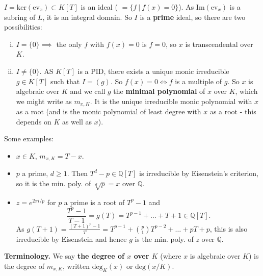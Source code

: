 \documentclass{article}
\theoremstyle{definition}
\begin{document}
$I = \text{ker}(\text{ev}_x) \subset K[T]$ is an ideal ( $= \{f ~|~ f(x)=0\}$). As $\text{Im}(\text{ev}_x)$ is a subring of $L$, it is an integral domain. So $I$ is a \textbf{prime} ideal, so there are two possibilities:
\begin{enumerate}[(i)]
    \item $I = \{0\} \implies $ the only $f$ with $f(x)=0$ is $f=0$, so $x$ is transcendental over $K$.
    \item $I \neq \{0\}$. AS $K[T]$ is a PID, there exists a unique monic irreducible $g \in K[T]$ such that $I = (g)$. So $f(x) = 0 \iff f$ is a multiple of $g$. So $x$ is algebraic over $K$ and we call $g$ the \textbf{minimal polynomial} of $x$ over $K$, which we might write as $m_{x,K}$. It is the unique irreducible monic polynomial with $x$ as a root (and is the monic polynomial of least degree with $x$ as a root - this depends on $K$ as well as $x$).
\end{enumerate}
Some examples:
\begin{itemize}
    \item $x \in K$, $m_{x,K} = T-x$.
    \item $p$ a prime, $d \ge 1$. Then $T^d - p \in \mathbb{Q}[T]$ is irreducible by Eisenstein's criterion, so it is the min. poly. of $\sqrt[d]{p} = x$ over $\mathbb{Q}$.
    \item $z = e^{2 \pi i/p}$ for $p$ a prime is a root of $T^p - 1$ and $$\frac{T^p-1}{T-1} = g(T) = T^{p-1} + \ldots + T + 1 \in \mathbb{Q}[T].$$
    As $g(T+1) = \frac{(T+1)^p - 1}{T} = T^{p-1} + {{p} \choose {1}} T^{p-2} + \ldots + pT + p$, this is also irreducible by Eisenstein and hence $g$ is the min. poly. of $z$ over $\mathbb{Q}$.
\end{itemize}
\textbf{Terminology.} We say \textbf{the degree of $x$ over $K$} (where $x$ is algebraic over $K$) is the degree of $m_{x,K}$, written $\text{deg}_K(x)$ or $\text{deg}(x/K)$.
\vspace{1mm}
\end{document}

